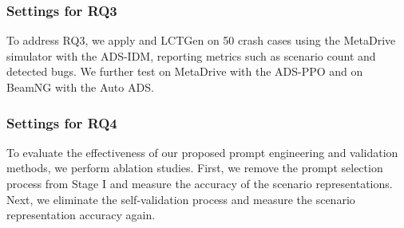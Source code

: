 \subsubsection{Settings for RQ3}
To address RQ3, we apply {\tool} and LCTGen on 50 crash cases using the MetaDrive simulator with the ADS-IDM, reporting metrics such as scenario count and detected bugs. We further test {\tool} on MetaDrive with the ADS-PPO and on BeamNG with the Auto ADS.

\subsubsection{Settings for RQ4}
To evaluate the effectiveness of our proposed prompt engineering and validation methods, we perform ablation studies. First, we remove the prompt selection process from Stage I and measure the accuracy of the scenario representations. Next, we eliminate the self-validation process and measure the scenario representation accuracy again.